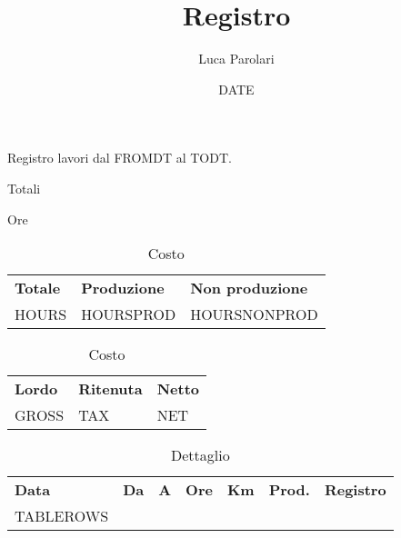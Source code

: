 \documentclass{article}
\author{Luca Parolari}
\date{DATE}
\title{Registro}
\begin{document}
\maketitle

Registro lavori dal FROMDT al TODT.

\begin{table}[!htb]
	\caption{Totali}
    \begin{minipage}{.5\linewidth}
      \caption{Ore}
      \centering
        \begin{tabular}{lll}
        	\textbf{Totale} & \textbf{Produzione} & \textbf{Non produzione} \\
            HOURS & HOURSPROD & HOURSNONPROD
        \end{tabular}
    \end{minipage}%
    \begin{minipage}{.5\linewidth}
      \centering
        \caption{Costo}
        \begin{tabular}{lll}
            \textbf{Lordo} & \textbf{Ritenuta} & \textbf{Netto} \\
            GROSS & TAX & NET
        \end{tabular}
    \end{minipage} 
\end{table}

\begin{center}
\begin{longtable}{lllllll}
 \caption{Dettaglio}\\
 \textbf{Data} & \textbf{Da} & \textbf{A} & \textbf{Ore} & \textbf{Km} & \textbf{Prod.} & \textbf{Registro} \\
 TABLEROWS
\end{longtable}
\end{center}
\end{document}
